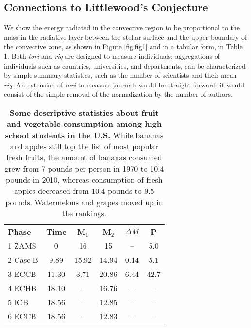 \subsection{Connections to Littlewood's Conjecture}

We show the energy radiated in the convective region to be propo\cite{Aston_Polz_2000}rtional to the mass in the radiative layer between the stellar surface and the upper boundary of the convective zone, as shown in Figure \ref{fig:fig1} and in a tabular form, in Table 1. Both {\it tori} and {\it riq} are designed to measure individuals; aggregations of individuals such as countries, universities, and departments, can be characterized by simple summary statistics, such as the number of scientists and their mean {\it riq}. An extension of {\it tori} to measure journals would be straight forward: it would consist of the simple removal of the normalization by the number of authors.  

\begin{table}
\begin{tabular}{lccccc}
\hline
\textbf{Phase}        & \textbf{Time} & \textbf{M$_1$}  & \textbf{M$_2$} &  \textbf{$\Delta M$} & \textbf{P} \\   
1 ZAMS           & 0      & 16     & 15    & --   & 5.0   \\            
2 Case B       & 9.89   & 15.92  & 14.94 & 0.14 & 5.1   \\
3 ECCB        & 11.30  &  3.71  & 20.86 & 6.44 & 42.7  \\
4 ECHB      & 18.10  & --     & 16.76 &  --  & --    \\
5 ICB       & 18.56  & --     & 12.85 &  --  & --    \\    
6 ECCB      & 18.56  & --     & 12.83 &  --  & --    \\
\hline
\end{tabular}
\caption{\textbf{Some descriptive statistics about fruit and vegetable consumption among high school students in the U.S.} While bananas and apples still top the list of most popular fresh fruits, the amount of bananas consumed grew from 7 pounds per person in 1970 to 10.4 pounds in 2010, whereas consumption of fresh apples decreased from 10.4 pounds to 9.5 pounds. Watermelons and grapes moved up in the rankings.}
\end{table}
